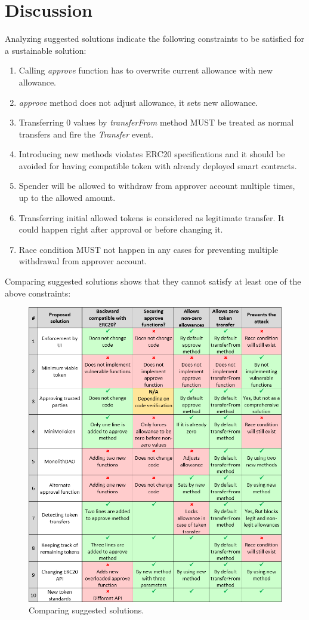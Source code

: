 
\section{Discussion}
Analyzing suggested solutions indicate the following constraints to be satisfied for a sustainable solution:
\begin{enumerate}
	\item Calling \textit{approve} function has to overwrite current allowance with new allowance.
	\item \textit{approve} method does not adjust allowance, it sets new allowance.
	\item Transferring 0 values by \textit{transferFrom} method MUST be treated as normal transfers and fire the \textit{Transfer} event.
	\item Introducing new methods violates ERC20 specifications and it should be avoided for having compatible token with already deployed smart contracts.
	\item Spender will be allowed to withdraw from approver account multiple times, up to the allowed amount.
	\item Transferring initial allowed tokens is considered as legitimate transfer. It could happen right after approval or before changing it.
	\item Race condition MUST not happen in any cases for preventing multiple withdrawal from approver account.\newline
\end{enumerate}
\noindent Comparing suggested solutions shows that they cannot satisfy at least one of the above constraints:
\begin{figure}[h]
	\centering
	\includegraphics[width=1.0\linewidth]{figures/multiple_withdrawal_27.png}
	\caption{Comparing suggested solutions.}
\end{figure}
